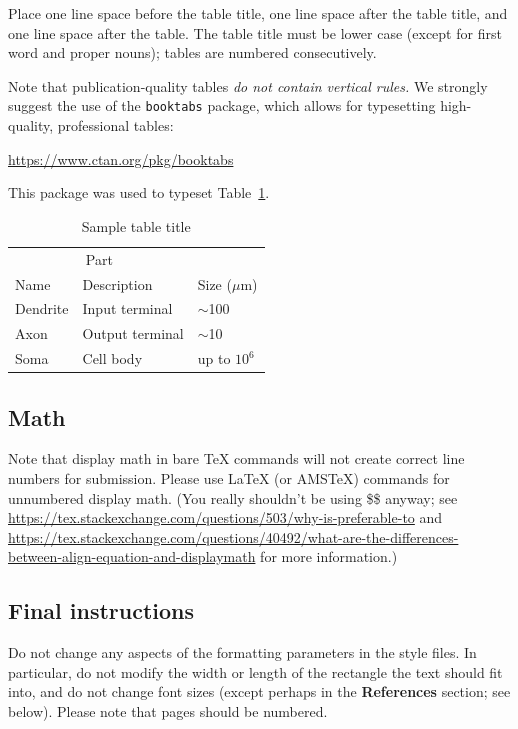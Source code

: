 \documentclass{article}
\begin{document}
Place one line space before the table title, one line space after the
table title, and one line space after the table. The table title must
be lower case (except for first word and proper nouns); tables are
numbered consecutively.


Note that publication-quality tables \emph{do not contain vertical rules.} We
strongly suggest the use of the \verb+booktabs+ package, which allows for
typesetting high-quality, professional tables:
\begin{center}
    \url{https://www.ctan.org/pkg/booktabs}
\end{center}
This package was used to typeset Table~\ref{sample-table}.


\begin{table}
    \caption{Sample table title}
    \label{sample-table}
    \centering
    \begin{tabular}{lll}
        \toprule
        \multicolumn{2}{c}{Part}                   \\
        \cmidrule(r){1-2}
        Name     & Description     & Size ($\mu$m) \\
        \midrule
        Dendrite & Input terminal  & $\sim$100     \\
        Axon     & Output terminal & $\sim$10      \\
        Soma     & Cell body       & up to $10^6$  \\
        \bottomrule
    \end{tabular}
\end{table}

\subsection{Math}
Note that display math in bare TeX commands will not create correct line numbers for submission. Please use LaTeX (or AMSTeX) commands for unnumbered display math. (You really shouldn't be using \$\$ anyway; see \url{https://tex.stackexchange.com/questions/503/why-is-preferable-to} and \url{https://tex.stackexchange.com/questions/40492/what-are-the-differences-between-align-equation-and-displaymath} for more information.)

\subsection{Final instructions}

Do not change any aspects of the formatting parameters in the style files.  In
particular, do not modify the width or length of the rectangle the text should
fit into, and do not change font sizes (except perhaps in the
\textbf{References} section; see below). Please note that pages should be
numbered.
\end{document}
